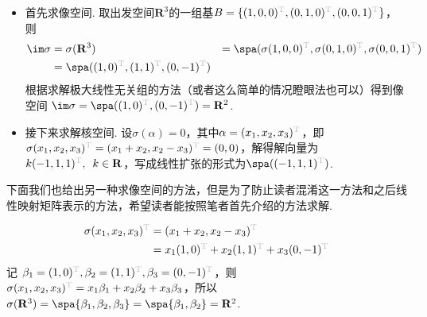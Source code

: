 \begin{solution}
    \begin{itemize}
        \item 首先求像空间. 取出发空间$\mathbf{R}^3$的一组基$B=\{(1,0,0)^{\color{lightgray}\mathrm{T}},(0,1,0)^{\color{lightgray}\mathrm{T}},(0,0,1)^{\color{lightgray}\mathrm{T}}\}$，则
        \begin{align*}
            \im \sigma
            &=\sigma(\mathbf{R}^3)
            &=\spa(
                \sigma(1,0,0)^{\color{lightgray}\mathrm{T}},
                \sigma(0,1,0)^{\color{lightgray}\mathrm{T}},
                \sigma(0,0,1)^{\color{lightgray}\mathrm{T}}
                 ) \\
            &=\spa(
                (1,0)^{\color{lightgray}\mathrm{T}},
                (1,1)^{\color{lightgray}\mathrm{T}},
                (0,-1)^{\color{lightgray}\mathrm{T}}
                )
        \end{align*}
        根据求解极大线性无关组的方法（或者这么简单的情况瞪眼法也可以）得到像空间
        $\im \sigma=\spa((1,0)^{\color{lightgray}\mathrm{T}},(0,-1)^{\color{lightgray}\mathrm{T}})=\mathbf{R}^2$.

        \item 接下来求解核空间. 设$\sigma(\alpha)=0$，其中$\alpha=(x_1,x_2,x_3)^{\color{lightgray}\mathrm{T}}$，即$\sigma(x_1,x_2,x_3)^{\color{lightgray}\mathrm{T}}=(x_1+x_2,x_2-x_3)^{\color{lightgray}\mathrm{T}}=(0,0)$，解得解向量为$k(-1,1,1)^{\color{lightgray}\mathrm{T}},\enspace k\in\mathbf{R}$，写成线性扩张的形式为$\spa((-1,1,1)^{\color{lightgray}\mathrm{T}})$.
    \end{itemize}
\end{solution}

下面我们也给出另一种求像空间的方法，但是为了防止读者混淆这一方法和之后线性映射矩阵表示的方法，希望读者能按照笔者首先介绍的方法求解.
\begin{solution}\label{ex:线性映射的像空间求解2}
    \begin{align*}
        \sigma(x_1, x_2, x_3)^{\color{lightgray}\mathrm{T}} &= (x_1 + x_2, x_2 - x_3)^{\color{lightgray}\mathrm{T}}\\
        &= x_1(1, 0)^{\color{lightgray}\mathrm{T}} + x_2(1, 1)^{\color{lightgray}\mathrm{T}} + x_3(0, -1)^{\color{lightgray}\mathrm{T}}
    \end{align*}
    记 $\beta_1 = (1, 0)^{\color{lightgray}\mathrm{T}}, \beta_2 = (1, 1)^{\color{lightgray}\mathrm{T}}, \beta_3 = (0, -1)^{\color{lightgray}\mathrm{T}}$，则 $\sigma(x_1, x_2, x_3)^{\color{lightgray}\mathrm{T}} = x_1 \beta_1 + x_2 \beta_2 + x_3 \beta_3$，所以 $\sigma(\mathbf{R}^3) = \spa\{\beta_1, \beta_2, \beta_3\} = \spa \{\beta_1, \beta_2\}=\mathbf{R}^2$.
\end{solution}



